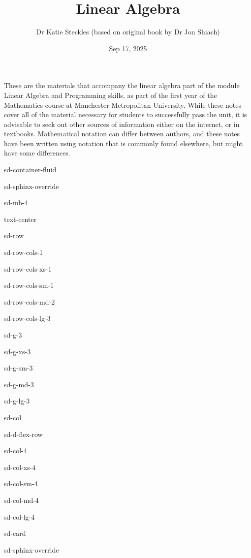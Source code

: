\documentclass[letterpaper,10pt,english]{jupyterBook}
\title{Linear Algebra}
\date{Sep 17, 2025}
\author{Dr Katie Steckles (based on original book by Dr Jon Shiach)}
\begin{document}
\pagestyle{empty}
\sphinxmaketitle
\pagestyle{plain}
\sphinxtableofcontents
\pagestyle{normal}
\label{\detokenize{_pages/0_intro::doc}}


\sphinxAtStartPar
These are the materials that accompany the linear algebra part of the module Linear Algebra and Programming skills, as part of the first year of the Mathematics course at Manchester Metropolitan University. While these notes cover all of the material necessary for students to successfully pass the unit, it is advisable to seek out other sources of information \sphinxhyphen{} either on the internet, or in textbooks. Mathematical notation can differ between authors, and these notes have been written using notation that is commonly found elsewhere, but might have some differences.

\begin{sphinxuseclass}{sd-container-fluid}
\begin{sphinxuseclass}{sd-sphinx-override}
\begin{sphinxuseclass}{sd-mb-4}
\begin{sphinxuseclass}{text-center}
\begin{sphinxuseclass}{sd-row}
\begin{sphinxuseclass}{sd-row-cols-1}
\begin{sphinxuseclass}{sd-row-cols-xs-1}
\begin{sphinxuseclass}{sd-row-cols-sm-1}
\begin{sphinxuseclass}{sd-row-cols-md-2}
\begin{sphinxuseclass}{sd-row-cols-lg-3}
\begin{sphinxuseclass}{sd-g-3}
\begin{sphinxuseclass}{sd-g-xs-3}
\begin{sphinxuseclass}{sd-g-sm-3}
\begin{sphinxuseclass}{sd-g-md-3}
\begin{sphinxuseclass}{sd-g-lg-3}
\begin{sphinxuseclass}{sd-col}
\begin{sphinxuseclass}{sd-d-flex-row}
\begin{sphinxuseclass}{sd-col-4}
\begin{sphinxuseclass}{sd-col-xs-4}
\begin{sphinxuseclass}{sd-col-sm-4}
\begin{sphinxuseclass}{sd-col-md-4}
\begin{sphinxuseclass}{sd-col-lg-4}
\begin{sphinxuseclass}{sd-card}
\begin{sphinxuseclass}{sd-sphinx-override}

\end{sphinxuseclass}
\end{sphinxuseclass}
\end{sphinxuseclass}
\end{sphinxuseclass}
\end{sphinxuseclass}
\end{sphinxuseclass}
\end{sphinxuseclass}
\end{sphinxuseclass}
\end{sphinxuseclass}
\end{sphinxuseclass}
\end{sphinxuseclass}
\end{sphinxuseclass}
\end{sphinxuseclass}
\end{sphinxuseclass}
\end{sphinxuseclass}
\end{sphinxuseclass}
\end{sphinxuseclass}
\end{sphinxuseclass}
\end{sphinxuseclass}
\end{sphinxuseclass}
\end{sphinxuseclass}
\end{sphinxuseclass}
\end{sphinxuseclass}
\end{sphinxuseclass}
\end{document}
